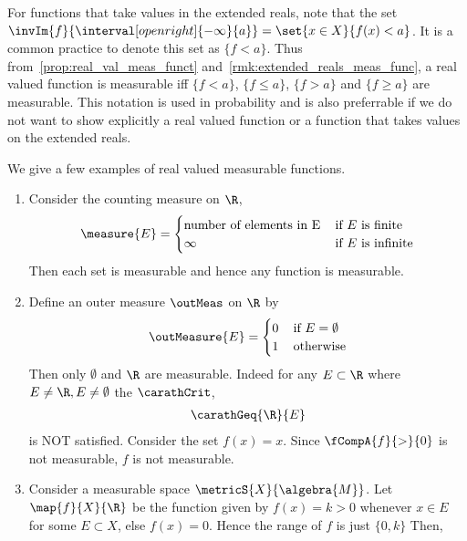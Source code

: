 For functions that take values in the extended reals, note that the set 
$\invIm{f}{\interval[open right]{-\infty}{a}} = \set{x \in X}{f(x) < a}$. It is a common
practice to denote this set as $\lbrace f < a \rbrace$. Thus from~\ref{prop:real_val_meas_funct} 
and~\ref{rmk:extended_reals_meas_func}, a real valued function is measurable iff $\lbrace f < a \rbrace$,
$\lbrace f \leq a \rbrace$, $\lbrace f > a \rbrace$ and $\lbrace f \geq a \rbrace$ are measurable. This
notation is used in probability and is also preferrable if we do not want to show explicitly a real valued
function or a function that takes values on the extended reals. 

\begin{Example}\label{ex:measurable_func}
    We give a few examples of real valued measurable functions.
    \begin{enumerate}
	\item
	    Consider the counting measure on $\R$,
	    \begin{equation*}
		\measure{E} = 
		\begin{cases}
		    \text{number of elements in E}\, &\text{if $E$ is finite}\\
		    \infty\, &\text{if $E$ is infinite}
		\end{cases}
	    \end{equation*}
	    Then each set is measurable and hence any function is measurable.
	\item
	    Define an outer measure $\outMeas$ on $\R$ by 
	    \begin{equation*}
		\outMeasure{E} = 
		\begin{cases}
		    0\, &\text{if $E = \emptyset$ }\\
		    1\, &\text{otherwise}
		\end{cases}
	    \end{equation*}
	    Then only $\emptyset$ and $\R$ are measurable. Indeed for any $E\subset \R$ where $E \neq \R,E\neq
	    \emptyset$ the $\carathCrit$, 
	    \begin{align*}
		\carathGeq{\R}{E}
	    \end{align*}
	    is NOT satisfied. Consider the set $f(x) = x$. Since $\fCompA{f}{>}{0}$ is not measurable, $f$ is
	    not measurable. 
	\item
	    Consider a measurable space $\metricS{X}{\algebra{M}}$. Let $\map{f}{X}{\R}$ be the
	    function given by $f(x) = k > 0$ whenever $x \in E$ for some $E\subset X$, else $f(x) = 0$. Hence the
	    range of $f$ is just $\lbrace 0,k\rbrace$ Then,

\end{enumerate}
\end{Example}
